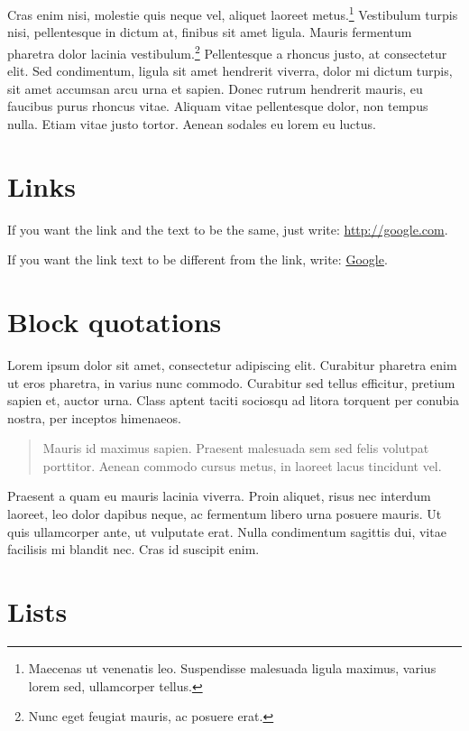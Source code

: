 \documentclass{article}
\begin{document}
Cras enim nisi, molestie quis neque vel, aliquet laoreet
metus.\footnote{Maecenas ut venenatis leo. Suspendisse malesuada ligula
  maximus, varius lorem sed, ullamcorper tellus.} Vestibulum turpis
nisi, pellentesque in dictum at, finibus sit amet ligula. Mauris
fermentum pharetra dolor lacinia vestibulum.\footnote{Nunc eget feugiat
  mauris, ac posuere erat.} Pellentesque a rhoncus justo, at consectetur
elit. Sed condimentum, ligula sit amet hendrerit viverra, dolor mi
dictum turpis, sit amet accumsan arcu urna et sapien. Donec rutrum
hendrerit mauris, eu faucibus purus rhoncus vitae. Aliquam vitae
pellentesque dolor, non tempus nulla. Etiam vitae justo tortor. Aenean
sodales eu lorem eu luctus.

\section{Links}

If you want the link and the text to be the same, just write:
\url{http://google.com}.

If you want the link text to be different from the link, write:
\href{http://google.com}{Google}.

\section{Block quotations}

Lorem ipsum dolor sit amet, consectetur adipiscing elit. Curabitur
pharetra enim ut eros pharetra, in varius nunc commodo. Curabitur sed
tellus efficitur, pretium sapien et, auctor urna. Class aptent taciti
sociosqu ad litora torquent per conubia nostra, per inceptos himenaeos.

\begin{quote}
Mauris id maximus sapien. Praesent malesuada sem sed felis volutpat
porttitor. Aenean commodo cursus metus, in laoreet lacus tincidunt vel.
\end{quote}

Praesent a quam eu mauris lacinia viverra. Proin aliquet, risus nec
interdum laoreet, leo dolor dapibus neque, ac fermentum libero urna
posuere mauris. Ut quis ullamcorper ante, ut vulputate erat. Nulla
condimentum sagittis dui, vitae facilisis mi blandit nec. Cras id
suscipit enim.

\section{Lists}
\end{document}
